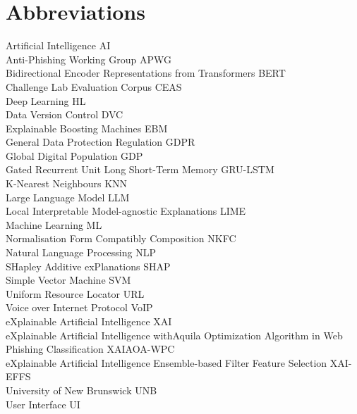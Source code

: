 
\section*{Abbreviations}

\large
Artificial Intelligence \hfill AI\\
Anti-Phishing Working Group \hfill APWG\\
Bidirectional Encoder Representations from Transformers \hfill BERT\\
Challenge Lab Evaluation Corpus \hfill CEAS\\
Deep Learning \hfill HL\\
Data Version Control \hfill DVC\\
Explainable Boosting Machines \hfill EBM\\
General Data Protection Regulation \hfill GDPR\\
Global Digital Population \hfill GDP\\
Gated Recurrent Unit Long Short-Term Memory \hfill GRU-LSTM\\
K-Nearest Neighbours \hfill KNN\\
Large Language Model \hfill LLM\\
Local Interpretable Model-agnostic Explanations \hfill LIME\\
Machine Learning \hfill ML\\
Normalisation Form Compatibly Composition \hfill NKFC\\
Natural Language Processing \hfill NLP \\
SHapley Additive exPlanations \hfill SHAP\\
Simple Vector Machine \hfill SVM\\
Uniform Resource Locator \hfill URL\\
Voice over Internet Protocol \hfill VoIP\\
eXplainable Artificial Intelligence \hfill XAI\\
eXplainable Artificial Intelligence with\newline Aquila Optimization Algorithm in Web Phishing Classification \hfill XAIAOA-WPC\\
eXplainable Artificial Intelligence Ensemble-based Filter Feature Selection \hfill XAI-EFFS\\
University of New Brunswick \hfill UNB\\
User Interface \hfill UI\\
